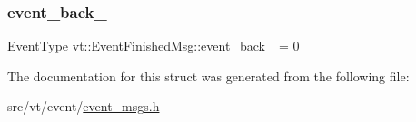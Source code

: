 \mbox{\label{structvt_1_1_event_finished_msg_a029e345a1de93af7153ca3ebf62ae659}} 
\subsubsection{\texorpdfstring{event\+\_\+back\+\_\+}{event\_back\_}}
{\footnotesize\ttfamily \hyperlink{namespacevt_a009267401def7ae8bf201892222d060f}{Event\+Type} vt\+::\+Event\+Finished\+Msg\+::event\+\_\+back\+\_\+ = 0}



The documentation for this struct was generated from the following file\+:\begin{DoxyCompactItemize}
\item 
src/vt/event/\hyperlink{event__msgs_8h}{event\+\_\+msgs.\+h}\end{DoxyCompactItemize}
